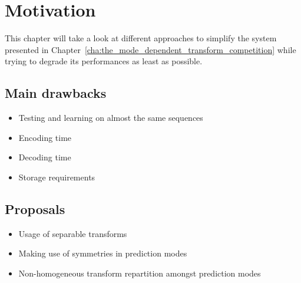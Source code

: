 \documentclass[11pt,a4paper,openright,twoside]{book}
\numberwithin{equation}{section} %
\begin{document}
\section{Motivation}
\label{sec:motivation}

This chapter will take a look at different approaches to simplify the
system presented in
Chapter~\ref{cha:the_mode_dependent_transform_competition} while trying
to degrade its performances as least as possible.

\subsection{Main drawbacks}
\label{sub:main_drawbacks}

\begin{itemize}
	\item Testing and learning on almost the same sequences
	\item Encoding time
	\item Decoding time
	\item Storage requirements
\end{itemize}

\subsection{Proposals}
\label{sub:proposals}

\begin{itemize}
	\item Usage of separable transforms
	\item Making use of symmetries in prediction modes
	\item Non-homogeneous transform repartition amongst prediction modes
\end{itemize}

\backmatter


\end{document}
